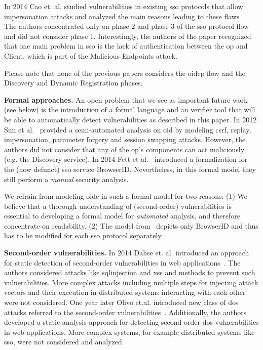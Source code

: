 \documentclass[conference,compsoc]{IEEEtran}
\renewcommand*{\paragraph}[1]{\vspace{2mm}\noindent\textbf{#1.}}
\begin{document}
In 2014 Cao et. al. studied vulnerabilities in existing \gls{sso} protocols that allow impersonation attacks and analyzed the main reasons leading to these flaws~\cite{raey}. The authors concentrated only on phase 2 and phase 3 of the \gls{sso} protocol flow and did not consider phase 1. Interestingly, the authors of the paper recognized that one main problem in \gls{sso} is the lack of authentication between the \gls{op} and Client, which is part of the Malicious Endpoints attack.

Please note that none of the previous papers considers the \gls{oidcp} flow and the Discovery and Dynamic Registration phases.

\paragraph{Formal approaches}
An open problem that we see as important future work (see below) is the introduction of a formal language and an verifier tool that will be able to automatically detect vulnerabilities as described in this paper. 
In 2012 Sun et al.~\cite{journals/compsec/SunHB12} provided a semi-automated analysis on \gls{oid} by modeling \gls{csrf}, replay, impersonation, parameter forgery and session swapping attacks. 
However, the authors did not consider that any of the \gls{op}'s components can act maliciously (e.g. the Discovery service). 
In 2014 Fett et al.~\cite{FettKuestersSchmitz-SP-2014} introduced a formalization for the (now defunct) \gls{sso} service BrowserID. 
Nevertheless, in this formal model they still perform a {\em manual} security analysis. 

We refrain from modeling \gls{oidc} in such a formal model for two reasons: (1) We believe that a thorough understanding of (second-order) vulnerabilities is essential to developing a formal model for {\em automated} analysis, and therefore concentrate on readability. (2) The model from~\cite{FettKuestersSchmitz-SP-2014} depicts only BrowserID and thus has to be modified for each \gls{sso} protocol separately.

\paragraph{Second-order vulnerabilities}
In 2014 Dahse et. al. introduced an approach for static detection of second-order vulnerabilities in web applications~\cite{Dahse2014}. The authors considered attacks like \gls{sqlinjection} and \gls{xss} and methods to prevent such vulnerabilities.
More complex attacks including multiple steps for injecting attack vectors and their execution in distributed systems interacting with each other were not considered.
One year later Olivo et.al. introduced new class of \gls{dos} attacks referred to the second-order vulnerabilities~\cite{Olivo2015}. Additionally, the authors developed a static analysis approach for detecting second-order \gls{dos}  vulnerabilities in  web applications. 
More complex systems, for example distributed systems like \gls{sso}, were not considered and analyzed.
\end{document}
